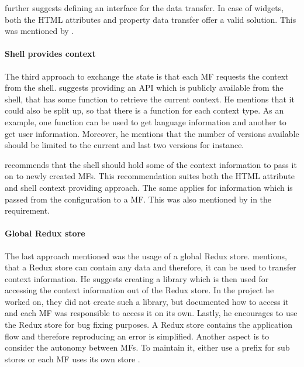 \textciteSteyer{} further suggests defining an interface for the data transfer.
In case of widgets, both the \ac{HTML} attributes and property data transfer offer a valid solution.
This was mentioned by \textciteRehm{}.



\paragraph{Shell provides context}

The third approach to exchange the state is that each \ac{MF} requests the context from the shell.
\textciteOlleck{} suggests providing an \ac{API} which is publicly available from the shell, that has some function to retrieve the current context.
He mentions that it could also be split up, so that there is a function for each context type.
As an example, one function can be used to get language information and another to get user information.
Moreover, he mentions that the number of versions available should be limited to the current and last two versions for instance.

\textciteSteyer{} recommends that the shell should hold some of the context information to pass it on to newly created \acp{MF}.
This recommendation suites both the \ac{HTML} attribute and shell context providing approach. The same applies for information which is passed from the configuration to a \ac{MF}.
This was also mentioned by \textciteOlleck{} in the \textit{} requirement.



\paragraph{Global Redux store}

The last approach mentioned was the usage of a global Redux store\footnotemark.
\textciteJovanovic{} mentions, that a Redux store can contain any data and therefore, it can be used to transfer context information.
He suggests creating a library which is then used for accessing the context information out of the Redux store.
In the project he worked on, they did not create such a library, but documented how to access it and each \ac{MF} was responsible to access it on its own.
Lastly, he encourages to use the Redux store for bug fixing purposes.
A Redux store contains the application flow and therefore reproducing an error is simplified.
Another aspect is to consider the autonomy between \acp{MF}.
To maintain it, either use a prefix for sub stores \cite{Dornenburg.2019} or each \ac{MF} uses its own store \cite{Laug.2018b}.

